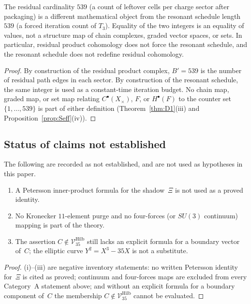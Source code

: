 \begin{proposition}\label{prop:res-vs-res}
The residual cardinality $539$ (a count of leftover cells per charge sector after packaging) is a different mathematical object from the resonant schedule length $539$ (a forced iteration count of $T_3$). Equality of the two integers is an equality of values, not a structure map of chain complexes, graded vector spaces, or sets. In particular, residual product cohomology does not force the resonant schedule, and the resonant schedule does not redefine residual cohomology.
\end{proposition}
\begin{proof}
By construction of the residual product complex, $B'=539$ is the number of residual path edges in each sector. By construction of the resonant schedule, the same integer is used as a constant-time iteration budget. No chain map, graded map, or set map relating $C^\bullet(X_\times)$, $F$, or $H^\bullet(F)$ to the counter set $\{1,\dots,539\}$ is part of either definition (Theorem~\ref{thm:D1}(iii) and Proposition~\ref{prop:Seff}(iv)).
\end{proof}

\subsection{Status of claims not established}
\begin{proposition}\label{prop:not-established}
The following are recorded as not established, and are not used as hypotheses in this paper.
\begin{enumerate}[label=(\roman*)]
\item A Petersson inner-product formula for the shadow~$\Xi$ is not used as a proved identity.
\item No Kronecker $11$-element purge and no four-forces (or $SU(3)$ continuum) mapping is part of the theory.
\item The assertion $C\notin\mathcal V_{35}^{\mathrm{Hilb}}$ still lacks an explicit formula for a boundary vector of~$C$; the elliptic curve $Y^2=X^3-35X$ is not a substitute.
\end{enumerate}
\end{proposition}
\begin{proof}
(i)--(iii) are negative inventory statements: no written Petersson identity for~$\Xi$ is cited as proved; continuum and four-forces maps are excluded from every Category~A statement above; and without an explicit formula for a boundary component of~$C$ the membership $C\notin\mathcal V_{35}^{\mathrm{Hilb}}$ cannot be evaluated.
\end{proof}

